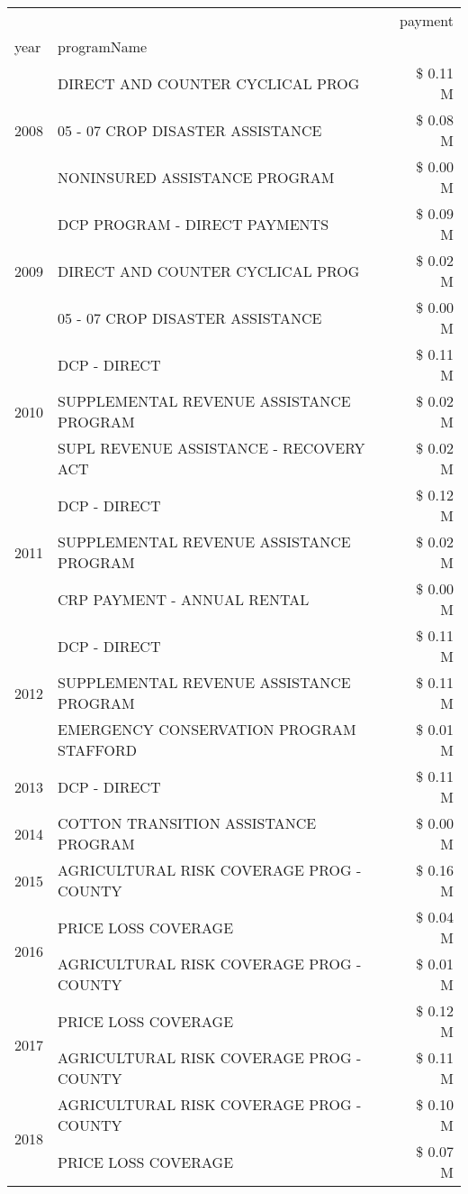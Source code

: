 \begin{tabular}{llr}
\toprule
 &  & payment \\
year & programName &  \\
\midrule
\multirow[t]{3}{*}{2008} & DIRECT AND COUNTER CYCLICAL PROG & \$ 0.11 M \\
 & 05 - 07 CROP DISASTER ASSISTANCE & \$ 0.08 M \\
 & NONINSURED ASSISTANCE PROGRAM & \$ 0.00 M \\
\cline{1-3}
\multirow[t]{3}{*}{2009} & DCP PROGRAM - DIRECT PAYMENTS & \$ 0.09 M \\
 & DIRECT AND COUNTER CYCLICAL PROG & \$ 0.02 M \\
 & 05 - 07 CROP DISASTER ASSISTANCE & \$ 0.00 M \\
\cline{1-3}
\multirow[t]{3}{*}{2010} & DCP - DIRECT & \$ 0.11 M \\
 & SUPPLEMENTAL REVENUE ASSISTANCE PROGRAM & \$ 0.02 M \\
 & SUPL REVENUE ASSISTANCE - RECOVERY ACT & \$ 0.02 M \\
\cline{1-3}
\multirow[t]{3}{*}{2011} & DCP - DIRECT & \$ 0.12 M \\
 & SUPPLEMENTAL REVENUE ASSISTANCE PROGRAM & \$ 0.02 M \\
 & CRP PAYMENT - ANNUAL RENTAL & \$ 0.00 M \\
\cline{1-3}
\multirow[t]{3}{*}{2012} & DCP - DIRECT & \$ 0.11 M \\
 & SUPPLEMENTAL REVENUE ASSISTANCE PROGRAM & \$ 0.11 M \\
 & EMERGENCY CONSERVATION PROGRAM STAFFORD & \$ 0.01 M \\
\cline{1-3}
2013 & DCP - DIRECT & \$ 0.11 M \\
\cline{1-3}
2014 & COTTON TRANSITION ASSISTANCE PROGRAM & \$ 0.00 M \\
\cline{1-3}
2015 & AGRICULTURAL RISK COVERAGE PROG - COUNTY & \$ 0.16 M \\
\cline{1-3}
\multirow[t]{2}{*}{2016} & PRICE LOSS COVERAGE & \$ 0.04 M \\
 & AGRICULTURAL RISK COVERAGE PROG - COUNTY & \$ 0.01 M \\
\cline{1-3}
\multirow[t]{2}{*}{2017} & PRICE LOSS COVERAGE & \$ 0.12 M \\
 & AGRICULTURAL RISK COVERAGE PROG - COUNTY & \$ 0.11 M \\
\cline{1-3}
\multirow[t]{3}{*}{2018} & AGRICULTURAL RISK COVERAGE PROG - COUNTY & \$ 0.10 M \\
 & PRICE LOSS COVERAGE & \$ 0.07 M \\

\end{tabular}

